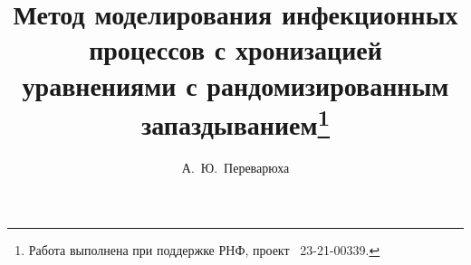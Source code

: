 \ifPDFTeX
\usepackage[T2A]{fontenc}
\usepackage[utf8]{inputenc} %
\usepackage[english,russian]{babel}
\fi




\usepackage{todonotes} %

\usepackage[russian]{nla}

%
%


%



\fi

%

\title{Метод моделирования инфекционных процессов с хронизацией уравнениями с рандомизированным 
запаздыванием\thanks{Работа выполнена при поддержке РНФ, проект \textnumero~23-21-00339.}}
\author{А.~Ю.~Переварюха
} %


